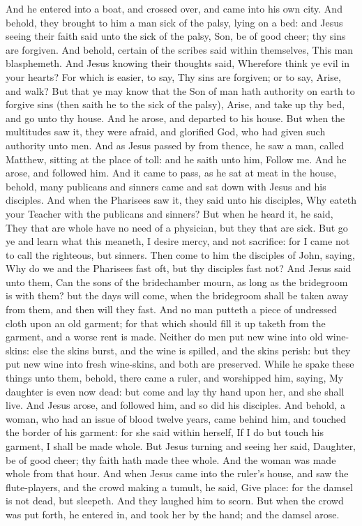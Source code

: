 And he entered into a boat, and crossed over, and came into his own city. And behold, they brought to him a man sick of the palsy, lying on a bed: and Jesus seeing their faith said unto the sick of the palsy, Son, be of good cheer; thy sins are forgiven. And behold, certain of the scribes said within themselves, This man blasphemeth. And Jesus knowing their thoughts said, Wherefore think ye evil in your hearts? For which is easier, to say, Thy sins are forgiven; or to say, Arise, and walk? But that ye may know that the Son of man hath authority on earth to forgive sins (then saith he to the sick of the palsy), Arise, and take up thy bed, and go unto thy house. And he arose, and departed to his house. But when the multitudes saw it, they were afraid, and glorified God, who had given such authority unto men.  And as Jesus passed by from thence, he saw a man, called Matthew, sitting at the place of toll: and he saith unto him, Follow me. And he arose, and followed him.  And it came to pass, as he sat at meat in the house, behold, many publicans and sinners came and sat down with Jesus and his disciples. And when the Pharisees saw it, they said unto his disciples, Why eateth your Teacher with the publicans and sinners? But when he heard it, he said, They that are whole have no need of a physician, but they that are sick. But go ye and learn what this meaneth, I desire mercy, and not sacrifice: for I came not to call the righteous, but sinners.  Then come to him the disciples of John, saying, Why do we and the Pharisees fast oft, but thy disciples fast not? And Jesus said unto them, Can the sons of the bridechamber mourn, as long as the bridegroom is with them? but the days will come, when the bridegroom shall be taken away from them, and then will they fast. And no man putteth a piece of undressed cloth upon an old garment; for that which should fill it up taketh from the garment, and a worse rent is made. Neither do men put new wine into old wine-skins: else the skins burst, and the wine is spilled, and the skins perish: but they put new wine into fresh wine-skins, and both are preserved.  While he spake these things unto them, behold, there came a ruler, and worshipped him, saying, My daughter is even now dead: but come and lay thy hand upon her, and she shall live. And Jesus arose, and followed him, and so did his disciples. And behold, a woman, who had an issue of blood twelve years, came behind him, and touched the border of his garment: for she said within herself, If I do but touch his garment, I shall be made whole. But Jesus turning and seeing her said, Daughter, be of good cheer; thy faith hath made thee whole. And the woman was made whole from that hour. And when Jesus came into the ruler’s house, and saw the flute-players, and the crowd making a tumult, he said, Give place: for the damsel is not dead, but sleepeth. And they laughed him to scorn. But when the crowd was put forth, he entered in, and took her by the hand; and the damsel arose. 
